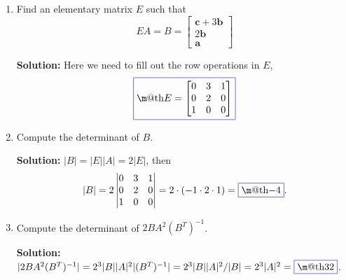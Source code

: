 \documentclass[14pt]{amsart}
\makeatletter
\newcommand{\?}{\stackrel{?}{=}}
\newcommand*{\boxedcolor}{blue}
\renewcommand{\boxed}[1]{\textcolor{\boxedcolor}{%
  \fbox{\normalcolor\m@th$\displaystyle#1$}}}
\makeatother
\begin{document}
\begin{enumerate}
\begin{enumerate}

\item  Find an elementary matrix $E$ such that
%
\begin{equation*}
EA = B = \begin{bmatrix}
\textbf{c} + 3\textbf{b}\\
2\textbf{b}\\
\textbf{a}
\end{bmatrix}
\end{equation*}

\textbf{Solution:  }  Here we need to fill out the row operations in $E$,
%
\begin{equation*}
\boxed{E = \begin{bmatrix}
0 & 3 & 1\\
0 & 2 & 0\\
1 & 0 & 0
\end{bmatrix}}
\end{equation*}

\item  Compute the determinant of $B$.

\textbf{Solution:  }  $|B| = |E||A| = 2|E|$, then
%
\begin{equation*}
|B| = 
2\begin{vmatrix}
0 & 3 & 1\\
0 & 2 & 0\\
1 & 0 & 0
\end{vmatrix} = 2\cdot (-1\cdot 2\cdot 1) = \boxed{-4}.
\end{equation*}

\item  Compute the determinant of $2BA^2(B^T)^{-1}$.

\textbf{Solution:  }  $|2BA^2(B^T)^{-1}| = 2^3|B||A|^2|(B^T)^{-1}| = 2^3|B||A|^2/|B| = 2^3|A|^2 = \boxed{32}$.

\end{enumerate}

\end{enumerate}
\end{document}
